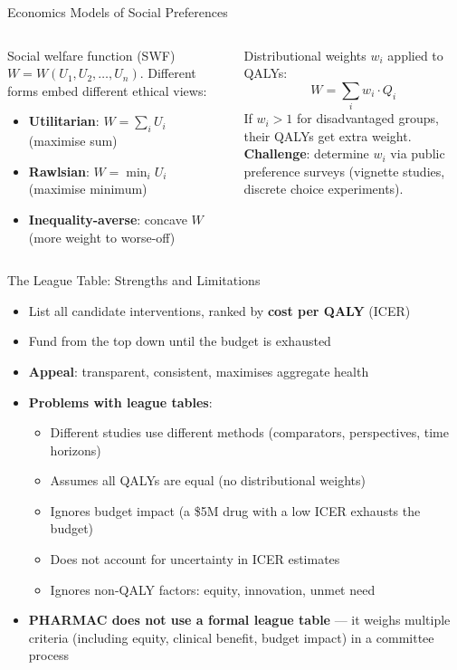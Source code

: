 \documentclass[aspectratio=169, 12pt]{beamer}
\begin{document}
\begin{frame}{Economics Models of Social Preferences}
  \begin{columns}
      \begin{block}{Social welfare function (SWF)}
        \small $W = W(U_1, U_2, \ldots, U_n)$. Different forms embed different ethical views:
        \begin{itemize}
          \item \textbf{Utilitarian}: $W = \sum_i U_i$ (maximise sum)
          \item \textbf{Rawlsian}: $W = \min_i U_i$ (maximise minimum)
          \item \textbf{Inequality-averse}: concave $W$ (more weight to worse-off)
        \end{itemize}
      \end{block}
      \small
      Distributional weights $w_i$ applied to QALYs:
      \[ W = \sum_i w_i \cdot Q_i \]
      If $w_i > 1$ for disadvantaged groups, their QALYs get extra weight.\\[0.2em]
      \textbf{Challenge}: determine $w_i$ via public preference surveys (vignette studies, discrete choice experiments).
  \end{columns}
\end{frame}

\begin{frame}{The League Table: Strengths and Limitations}
  \begin{itemize}
    \item List all candidate interventions, ranked by \textbf{cost per QALY} (ICER)
    \item Fund from the top down until the budget is exhausted
    \item \textbf{Appeal}: transparent, consistent, maximises aggregate health
    \item \textbf{Problems with league tables}:
    \begin{itemize}
      \item Different studies use different methods (comparators, perspectives, time horizons)
      \item Assumes all QALYs are equal (no distributional weights)
      \item Ignores budget impact (a \$5M drug with a low ICER exhausts the budget)
      \item Does not account for uncertainty in ICER estimates
      \item Ignores non-QALY factors: equity, innovation, unmet need
    \end{itemize}
    \item \textbf{PHARMAC does not use a formal league table} --- it weighs multiple criteria
          (including equity, clinical benefit, budget impact) in a committee process
  \end{itemize}
\end{frame}
\end{document}
